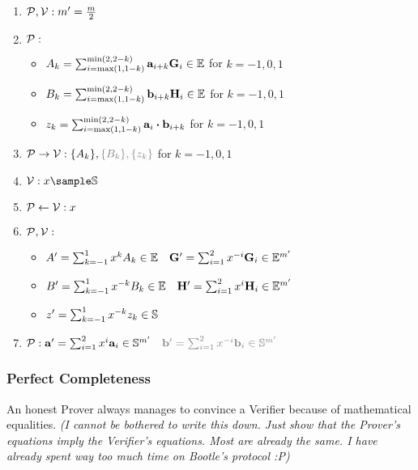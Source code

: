 \begin{enumerate}
    \item \hfill $\mathcal{P}, \mathcal{V}: m' = \frac{m}{2}$
    \item $\mathcal{P}:$
        \begin{itemize}
            \item $A_k = \sum^{\min(2, 2 - k)}_{i = \max(1, 1 - k)} \mathbf{a}_{i + k}\mathbf{G}_i \in \mathbb{E}$ for $k = -1, 0, 1$
            \item { \color{gray} $B_k = \sum^{\min(2, 2 - k)}_{i = \max(1, 1 - k)} \mathbf{b}_{i + k}\mathbf{H}_i \in \mathbb{E}$ for $k = -1, 0, 1$ }
            \item { \color{gray} $z_k = \sum^{\min(2, 2 - k)}_{i = \max(1, 1 - k)} \mathbf{a}_i \boldsymbol{\cdot} \mathbf{b}_{i + k}$ for $k = -1, 0, 1$ }
        \end{itemize}
    \item $\prover \to \verifier: \{ A_k \}, \color{gray} \{ B_k \}, \{ z_k \}$ for $k = -1, 0, 1$
    \item \hfill $\verifier: x \sample \scalars$
    \item \hfill $\mathcal{P} \leftarrow \mathcal{V}: x$
    \item \hfill $\mathcal{P}, \mathcal{V}:$
        \begin{itemize}
            \item \hfill $A' = \sum^{1}_{k = -1} x^kA_k \in \mathbb{E} \quad
                \mathbf{G}' = \sum^{2}_{i = 1} x^{-i}\mathbf{G}_i \in \mathbb{E}^{m'}$
            \item \hfill { \color{gray} $B' = \sum^{1}_{k = -1} x^{-k}B_k \in \mathbb{E} \quad
                \mathbf{H}' = \sum^{2}_{i = 1} x^i\mathbf{H}_i \in \mathbb{E}^{m'}$ }
            \item \hfill { \color{gray} $z' = \sum^{1}_{k = -1} x^{-k} z_k \in \mathbb{S}$ }
        \end{itemize}
    \item $\prover:
        \vec{a}' = \sum^{2}_{i = 1} x^i\vec{a}_i \in \scalars^{m'} \quad
        \color{gray} \vec{b}' = \sum^{2}_{i = 1} x^{-i}\vec{b}_i \in \scalars^{m'}$
\end{enumerate}

\subsubsection{Perfect Completeness}

An honest Prover always manages to convince a Verifier because of mathematical equalities.
\emph{(I cannot be bothered to write this down.
Just show that the Prover's equations imply the Verifier's equations.
Most are already the same.
I have already spent way too much time on Bootle's protocol :P)}


